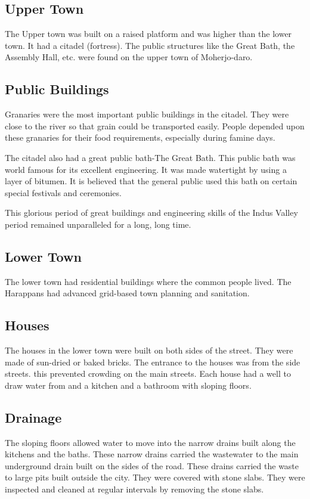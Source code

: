 \subsection{Upper Town}
The Upper town was built on a raised platform and was higher than the lower town. It had a citadel (fortress). The public structures like the Great Bath, the Assembly Hall, etc. were found on the upper town of Moherjo-daro.
\subsection{\textbf{Public Buildings}}
Granaries were the most important public buildings in the citadel. They were close to the river so that grain could be transported easily. People depended upon these granaries for their food requirements, especially during famine days.
\vspace{0.1in}
\par
The citadel also had a great public bath-The Great Bath. This public bath was world famous for its excellent engineering. It was made watertight by using a layer of bitumen. It is believed that the general public used this bath on certain special festivals and ceremonies.
\vspace{0.1in}
\par
This glorious period of great buildings and engineering skills of the Indus Valley period remained unparalleled for a long, long time.
\subsection{Lower Town}
The lower town had residential buildings where the common people lived. The Harappans had advanced grid-based town planning and sanitation.
\subsection{\textbf{Houses}}
The houses in the lower town were built on both sides of the street. They were made of sun-dried or baked bricks. The entrance to the houses was from the side streets. this prevented crowding on the main streets. Each house had a well to draw water from and a kitchen and a bathroom with sloping floors.
\subsection{\textbf{Drainage}}
The sloping floors allowed water to move into the narrow drains built along the kitchens and the baths. These narrow drains carried the wastewater to the main underground drain built on the sides of the road. These drains carried the waste to large pits built outside the city. They were covered with stone slabs. They were inspected and cleaned at regular intervals by removing the stone slabs.
\vspace{0.4in}
